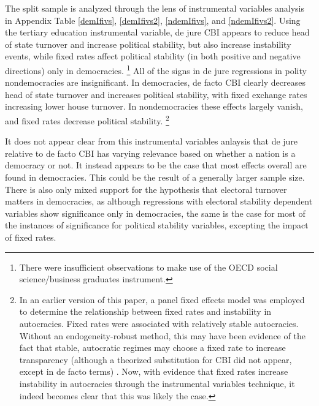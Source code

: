 \documentclass{article}
\begin{document}
    The split sample is analyzed through the lens of instrumental variables analysis in Appendix Table \ref*{demIfivs}, \ref*{demIfivs2}, \ref{ndemIfivs}, and \ref*{ndemIfivs2}. Using the tertiary education instrumental variable, de jure CBI appears to reduce head of state turnover and increase political stability, but also increase instability events, while fixed rates affect political stability (in both positive and negative directions) only in democracies. \footnote{There were insufficient observations to make use of the OECD social science/business graduates instrument.} All of the signs in de jure regressions in polity nondemocracies are insignificant. In democracies, de facto CBI clearly decreases head of state turnover and increases political stability, with fixed exchange rates increasing lower house turnover. In nondemocracies these effects largely vanish, and fixed rates decrease political stability. \footnote{In an earlier version of this paper, a panel fixed effects model was employed to determine the relationship between fixed rates and instability in autocracies. Fixed rates were associated with relatively stable autocracies. Without an endogeneity-robust method, this may have been evidence of the fact that stable, autocratic regimes may choose a fixed rate to increase transparency (although a theorized substitution for CBI did not appear, except in de facto terms) \citep{broz_political_2002}. Now, with evidence that fixed rates increase instability in autocracies through the instrumental variables technique, it indeed becomes clear that this was likely the case.}

    It does not appear clear from this instrumental variables anlaysis that de jure relative to de facto CBI has varying relevance based on whether a nation is a democracy or not. It instead appears to be the case that most effects overall are found in democracies. This could be the result of a generally larger sample size. There is also only mixed support for the hypothesis that electoral turnover matters in democracies, as although regressions with electoral stability dependent variables show significance only in democracies, the same is the case for most of the instances of significance for political stability variables, excepting the impact of fixed rates.
\end{document}
